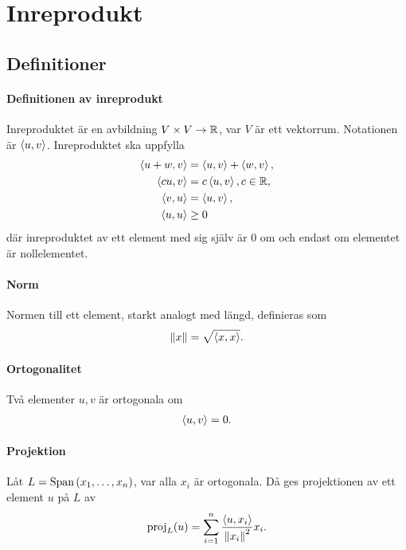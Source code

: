 \section{Inreprodukt}

\subsection{Definitioner}

\paragraph{Definitionen av inreprodukt}
Inreproduktet är en avbildning $V\times V\to\mathbb{R}$, var $V$ är ett vektorrum. Notationen är $\expval{u, v}$. Inreproduktet ska uppfylla
\begin{align*}
	\expval{u + w, v} &= \expval{u, v} + \expval{w, v}, \\
	\expval{cu, v}    &= c\expval{u, v}, c\in\mathbb{R}, \\
	\expval{v, u}     &= \expval{u, v}, \\
	\expval{u, u}     &\geq 0
\end{align*}
där inreproduktet av ett element med sig själv är $0$ om och endast om elementet är nollelementet.

\paragraph{Norm}
Normen till ett element, starkt analogt med längd, definieras som
\begin{align*}
	\norm{x} = \sqrt{\expval{x, x}}.
\end{align*}

\paragraph{Ortogonalitet}\label{par:orthogonality}
Två elementer $u, v$ är ortogonala om
\begin{align*}
	\expval{u, v} = 0.
\end{align*}

\paragraph{Projektion}
Låt $L = \text{Span}\left(x_1, \dots, x_n\right)$, var alla $x_i$ är ortogonala. Då ges projektionen av ett element $u$ på $L$ av
\begin{align*}
	\text{proj}_{L}(u) = \sum\limits_{i = 1}^{n}\frac{\expval{u, x_i}}{\norm{x_i}^2}x_i.
\end{align*}

